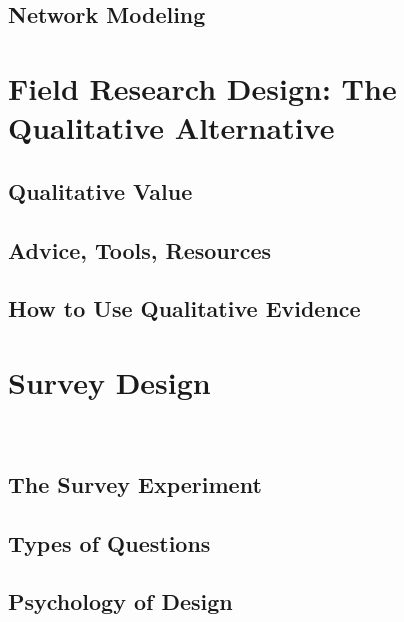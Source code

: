 \documentclass[12pt]{article}\usepackage[]{graphicx}\usepackage[]{color}
\newenvironment{knitrout}{}{} %
\begin{document}
\begin{flushleft}
\begin{center}
\begin{knitrout}
\end{knitrout}
\end{center}

\subsection{Network Modeling}

\clearpage
\section{Field Research Design: The Qualitative Alternative}

\subsection{Qualitative Value}

\subsection{Advice, Tools, Resources}

\subsection{How to Use Qualitative Evidence}



\clearpage
\section{Survey Design}
\hfill \\

\subsection{The Survey Experiment}

\subsection{Types of Questions}

\subsection{Psychology of Design}



\hfill \\

\end{flushleft}
\end{document}
